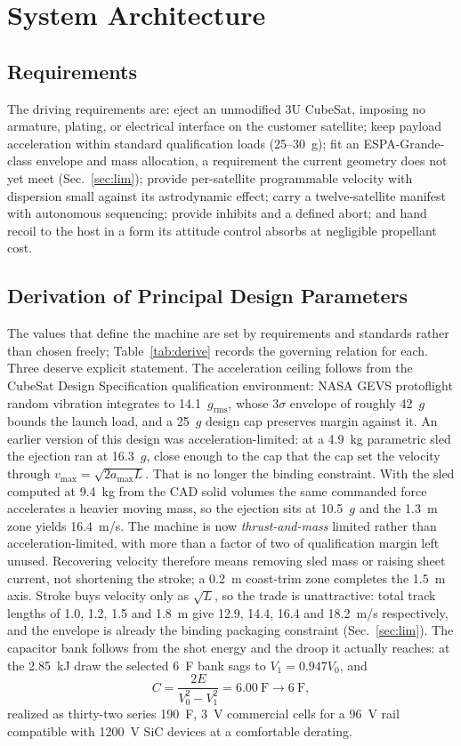\documentclass[conference]{IEEEtran}
\begin{document}
\section{System Architecture}
\subsection{Requirements}
The driving requirements are: eject an unmodified 3U CubeSat, imposing no armature, plating, or electrical interface on the customer satellite; keep payload acceleration within standard qualification loads (25--30~g); fit an ESPA-Grande-class envelope and mass allocation, a requirement the current geometry does not yet meet (Sec.~\ref{sec:lim}); provide per-satellite programmable velocity with dispersion small against its astrodynamic effect; carry a twelve-satellite manifest with autonomous sequencing; provide inhibits and a defined abort; and hand recoil to the host in a form its attitude control absorbs at negligible propellant cost.

\subsection{Derivation of Principal Design Parameters}
The values that define the machine are set by requirements and standards rather than chosen freely; Table~\ref{tab:derive} records the governing relation for each. Three deserve explicit statement. The acceleration ceiling follows from the CubeSat Design Specification qualification environment: NASA GEVS \cite{gevs} protoflight random vibration integrates to 14.1~$g_{\mathrm{rms}}$, whose $3\sigma$ envelope of roughly 42~$g$ bounds the launch load, and a 25~$g$ design cap preserves margin against it. An earlier version of this design was acceleration-limited: at a 4.9~kg parametric sled the ejection ran at 16.3~$g$, close enough to the cap that the cap set the velocity through $v_{\max}=\sqrt{2a_{\max}L}$. That is no longer the binding constraint. With the sled computed at 9.4~kg from the CAD solid volumes the same commanded force accelerates a heavier moving mass, so the ejection sits at 10.5~$g$ and the 1.3~m zone yields 16.4~m/s. The machine is now \emph{thrust-and-mass} limited rather than acceleration-limited, with more than a factor of two of qualification margin left unused. Recovering velocity therefore means removing sled mass or raising sheet current, not shortening the stroke; a 0.2~m coast-trim zone completes the 1.5~m axis. Stroke buys velocity only as $\sqrt{L}$, so the trade is unattractive: total track lengths of 1.0, 1.2, 1.5 and 1.8~m give 12.9, 14.4, 16.4 and 18.2~m/s respectively, and the envelope is already the binding packaging constraint (Sec.~\ref{sec:lim}). The capacitor bank follows from the shot energy and the droop it actually reaches: at the 2.85~kJ draw the selected 6~F bank sags to $V_1=0.947V_0$, and
\begin{equation}
C=\frac{2E}{V_0^2-V_1^2}=6.00~\mathrm{F}\rightarrow 6~\mathrm{F},
\end{equation}
realized as thirty-two series 190~F, 3~V commercial cells for a 96~V rail compatible with 1200~V SiC devices at a comfortable derating.
\end{document}
